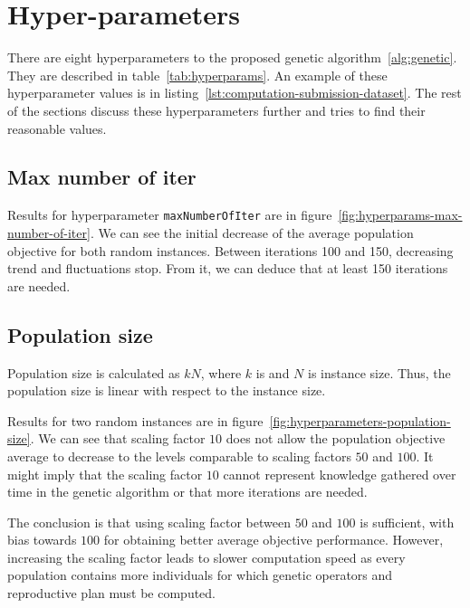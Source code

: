 \newpage


\section{Hyper-parameters}\label{sec:hyper-parameters}

There are eight hyperparameters to the proposed genetic algorithm~\ref{alg:genetic}.
They are described in table~\ref{tab:hyperparams}.
An example of these hyperparameter values is in listing~\ref{lst:computation-submission-dataset}.
The rest of the sections discuss these hyperparameters further and tries to find their reasonable values.



\subsection{Max number of iter}\label{subsec:max-number-of-iter}
Results for hyperparameter \verb|maxNumberOfIter| are in figure~\ref{fig:hyperparams-max-number-of-iter}.
We can see the initial decrease of the average population objective for both random instances.
Between iterations 100 and 150, decreasing trend and fluctuations stop.
From it, we can deduce that at least 150 iterations are needed.

\subsection{Population size}\label{subsec:population-size}

Population size is calculated as $kN$, where $k$ is 
and $N$ is instance size.
Thus, the population size is linear with respect to the instance size.

Results for two random instances are in figure~\ref{fig:hyperparameters-population-size}.
We can see that scaling factor $10$ does not allow
the population objective average to decrease to the levels comparable to scaling factors $50$ and $100$.
It might imply that the scaling factor $10$ cannot represent knowledge gathered over time
in the genetic algorithm or that more iterations are needed.

The conclusion is that using scaling factor between $50$ and $100$ is sufficient, with bias towards $100$
for obtaining better average objective performance.
However, increasing the scaling factor leads to slower computation speed as every population contains
more individuals for which genetic operators and reproductive plan must be computed.

